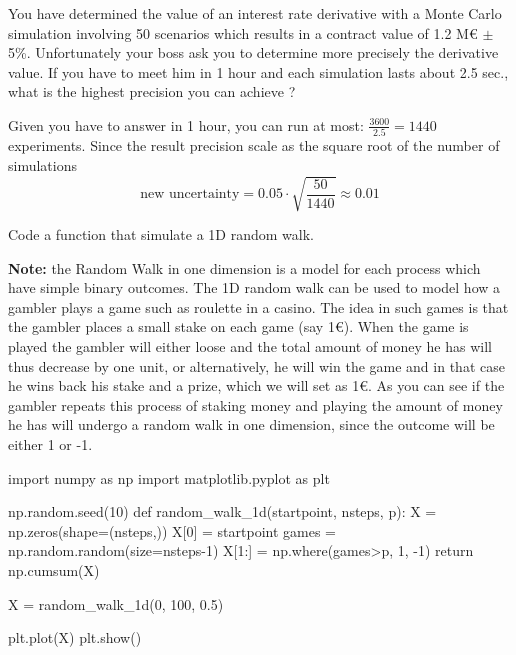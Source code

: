 \documentclass[12pt,a4paper]{book}
\begin{document}
\begin{exercise}[subtitle={Monte Carlo}]
You have determined the value of an interest rate derivative with a Monte Carlo simulation involving 50 scenarios which results in a contract value of 1.2 M€ $\pm$ 5\%. Unfortunately your boss ask you to determine more precisely the derivative value. If you have to meet him in 1 hour and each simulation lasts about 2.5 sec., what is the highest precision you can achieve ?
\end{exercise}
\begin{solution}
Given you have to answer in 1 hour, you can run at most: $\frac{3600}{2.5}=1440$ experiments. Since the result precision scale as the square root of the number of simulations
\begin{equation*}
\textrm{new uncertainty} = 0.05 \cdot \sqrt{\frac{50}{1440}} \approx 0.01
\end{equation*}
\end{solution}

\begin{exercise}[subtitle={1D Random Walk (\texttt{python})}, label={ex:2.2}]
Code a function that simulate a 1D random walk. 

\textbf{Note: } the Random Walk in one dimension is a model for each process which have simple binary outcomes.
The 1D random walk can be used to model how a gambler plays a game such as roulette in a casino. The idea in such games is that the gambler places a small stake on each game (say 1€). When the game is played the gambler will either loose and the total amount of money he has will thus decrease by one unit, or alternatively, he will win the game and in that case he wins back his stake and a prize, which we will set as 1€. As you can see if the gambler repeats this process of staking money and playing the amount of money he has will undergo a random walk in one dimension, since the outcome will be either 1 or -1.
\end{exercise}

\begin{solution}
\begin{ipython}
import numpy as np
import matplotlib.pyplot as plt

np.random.seed(10)
def random_walk_1d(startpoint, nsteps, p):
    X = np.zeros(shape=(nsteps,))
    X[0] = startpoint
    games = np.random.random(size=nsteps-1)
    X[1:] = np.where(games>p, 1, -1)
    return np.cumsum(X)

X = random_walk_1d(0, 100, 0.5)

plt.plot(X)
plt.show()
\end{ipython}
\end{solution}
\end{document}
